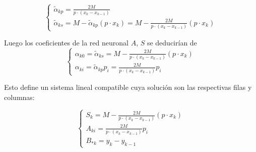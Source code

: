 \begin{equation}
    \left\{ 
        \begin{array}{l}
            \tilde{\alpha}_{k p} = \frac{2 M}{p \cdot (x_k - x_{k-1})}
            \\
            \tilde{\alpha}_{k s} 
            = M -  \tilde{\alpha}_{k p}(p \cdot x_{k})
            = M -  \frac{2 M}{p \cdot (x_k - x_{k-1})}(p \cdot x_{k}) 
        \end{array}
    \right.
\end{equation}

Luego los coeficientes de la red neuronal $A$, $S$ se deducirían de 
\begin{equation}
    \left\{ 
        \begin{array}{l}
            \alpha_{k 0} = \tilde{\alpha}_{k s} =
                M -  \frac{2 M}{p \cdot (x_k - x_{k-1})}(p \cdot x_{k})        
            \\
            \alpha_{k i} =  \tilde{\alpha}_{k p} p_{i}
            = 
            \frac{2 M}{p \cdot (x_k - x_{k-1})}
            p_i 
        \end{array}
        \right.
\end{equation}

Esto define un sistema lineal compatible
cuya solución son las respectivas filas y columnas: 

\begin{equation}
    \left\{ 
        \begin{array}{l}
            S_{k} =
                M -  \frac{2 M}{p \cdot (x_k - x_{k-1})}(p \cdot x_{k})
            \\
            A_{k i} = \frac{2 M}{p \cdot (x_k - x_{k-1})}
            p_{i} 
            \\
            B_{* k} = y_k - y_{k-1}
        \end{array}
    \right.
\end{equation}  

